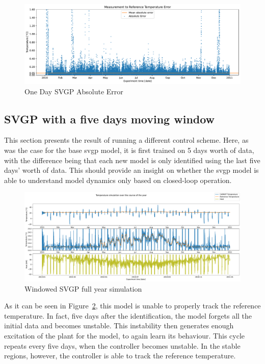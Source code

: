 \begin{figure}[ht]
    \centering
    \includegraphics[width =
    \textwidth]{Plots/6_SVGP_96pts_inf_window_12_averageYear_abserr.pdf}
    \caption{One Day SVGP Absolute Error}
    \label{fig:SVGP_96pts_abserr}
\end{figure}

\subsection{SVGP with a five days moving window}\label{sec:svgp_window}

This section presents the result of running a different control scheme. Here, as
was the case for the base \acrshort{svgp} model, it is first trained on 5 days
worth of data, with the difference being that each new model is only identified
using the last five days' worth of data. This should provide an insight on
whether the \acrshort{svgp} model is able to understand model dynamics only
based on closed-loop operation.

\begin{figure}[ht]
    \centering
    \includegraphics[width =
    \textwidth]{Plots/5_SVGP_480pts_480pts_window_12_averageYear_fullyear.pdf}
    \caption{Windowed SVGP full year simulation}
    \label{fig:SVGP_480window_fullyear_simulation}
\end{figure}

As it can be seen in Figure~\ref{fig:SVGP_480window_fullyear_simulation}, this
model is unable to properly track the reference temperature. In fact, five days
after the identification, the model forgets all the initial data and becomes
unstable. This instability then generates enough excitation of the plant for the
model, to again learn its behaviour. This cycle repeats every five days, when the
controller becomes unstable. In the stable regions, however, the controller is
able to track the reference temperature. 


